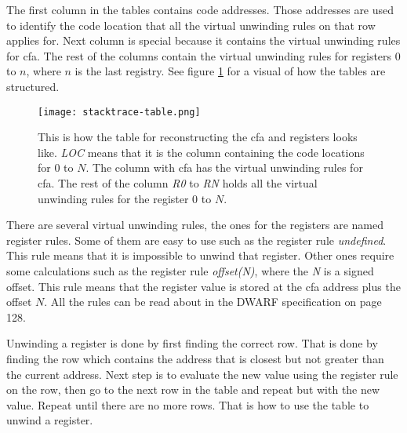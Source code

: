 The first column in the tables contains code addresses.
Those addresses are used to identify the code location that all the virtual unwinding rules on that row applies for.
Next column is special because it contains the virtual unwinding rules for \gls{cfa}.
The rest of the columns contain the virtual unwinding rules for registers $0$ to $n$, where $n$ is the last registry.
See figure \ref{fig:stacktracetable} for a visual of how the tables are structured.


\begin{figure}[h]
	\centering
	\texttt{[image: stacktrace-table.png]}
	\caption{This is how the table for reconstructing the \gls{cfa} and registers looks like. \emph{LOC} means that it is the column containing the code locations for $0$ to $N$. The column with \gls{cfa} has the virtual unwinding rules for \gls{cfa}. The rest of the column \emph{R0} to \emph{RN} holds all the virtual unwinding rules for the register $0$ to $N$.}
	\label{fig:stacktracetable}
\end{figure}


There are several virtual unwinding rules, the ones for the registers are named register rules.
Some of them are easy to use such as the register rule \emph{undefined}.
This rule means that it is impossible to unwind that register.
Other ones require some calculations such as the register rule \emph{offset(N)}, where the \emph{N} is a signed offset.
This rule means that the register value is stored at the \gls{cfa} address plus the offset $N$.
All the rules can be read about in the \gls{DWARF} specification \cite{dwarf} on page 128.


Unwinding a register is done by first finding the correct row.
That is done by finding the row which contains the address that is closest but not greater than the current address.
Next step is to evaluate the new value using the register rule on the row, then go to the next row in the table and repeat but with the new value.
Repeat until there are no more rows.
That is how to use the table to unwind a register.
